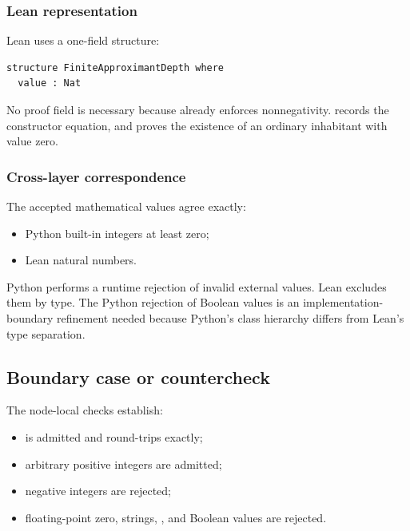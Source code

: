 \subsubsection{Lean representation}\label{lean-representation-1}

Lean uses a one-field structure:

\begin{verbatim}
structure FiniteApproximantDepth where
  value : Nat
\end{verbatim}

No proof field is necessary because \texttt{\protect{}} already enforces
nonnegativity. \texttt{\protect{}} records the constructor equation, and
\texttt{\protect{}} proves the existence of an ordinary inhabitant
with value zero.

\subsubsection{Cross-layer
correspondence}\label{cross-layer-correspondence-1}

The accepted mathematical values agree exactly:

\begin{itemize}
\tightlist
\item
  Python built-in integers at least zero;
\item
  Lean natural numbers.
\end{itemize}

Python performs a runtime rejection of invalid external values. Lean
excludes them by type. The Python rejection of Boolean values is an
implementation-boundary refinement needed because Python's class
hierarchy differs from Lean's type separation.

\subsection{Boundary case or
countercheck}\label{boundary-case-or-countercheck-1}

The node-local checks establish:

\begin{itemize}
\tightlist
\item
  \texttt{\protect{}} is admitted and round-trips exactly;
\item
  arbitrary positive integers are admitted;
\item
  negative integers are rejected;
\item
  floating-point zero, strings, \texttt{\protect{}}, and Boolean values are
  rejected.
\end{itemize}

